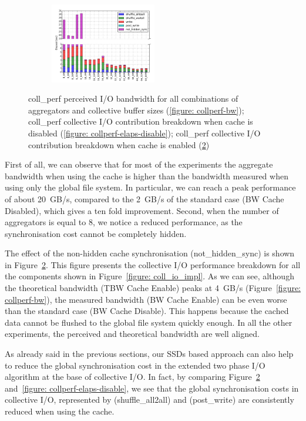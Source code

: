 \begin{figure}[!htb]
  \begin{subfigure}[b]{\textwidth}
  \centering
  \includegraphics[width=0.51\textwidth]{chapters/chapter3/figures/coll_perf_32GB_30sec_elapsed_enable}
  \caption{}
  \label{figure: collperf-elaps-enable}
  \end{subfigure}
  \caption{coll\_perf perceived I/O bandwidth for all combinations of aggregators and collective buffer sizes (\ref{figure: collperf-bw}); coll\_perf collective I/O contribution breakdown when cache is disabled (\ref{figure: collperf-elaps-disable}); 
  coll\_perf collective I/O contribution breakdown when cache is enabled (\ref{figure: collperf-elaps-enable})}
\end{figure}

First of all, we can observe that for most of the experiments the aggregate bandwidth when using the cache is higher than the bandwidth measured when using only the global file system. In particular, we can reach a peak performance of about 20~GB/s, 
compared to the 2~GB/s of the standard case (BW Cache Disabled), which gives a ten fold improvement. Second, when the number of aggregators is equal to 8, we notice a reduced performance, as the synchronisation cost cannot be completely hidden.

The effect of the non-hidden cache synchronisation (not\_hidden\_sync) is shown in Figure~\ref{figure: collperf-elaps-enable}. This figure presents the collective I/O performance breakdown for all the components shown in Figure~\ref{figure: coll_io_impl}. 
As we can see, although the theoretical bandwidth (TBW Cache Enable) peaks at 4~GB/s (Figure~\ref{figure: collperf-bw}), the measured bandwidth (BW Cache Enable) can be even worse than the standard case (BW Cache Disable). This happens because the cached 
data cannot be flushed to the global file system quickly enough. In all the other experiments, the perceived and theoretical bandwidth are well aligned.

As already said in the previous sections, our SSDs based approach can also help to reduce the global synchronisation cost in the extended two phase I/O algorithm at the base of collective I/O. In fact, by comparing Figure~\ref{figure: collperf-elaps-enable} 
and~\ref{figure: collperf-elaps-disable}, we see that the global synchronisation costs in collective I/O, represented by  (shuffle\_all2all) and  (post\_write) are consistently reduced when using the cache.

